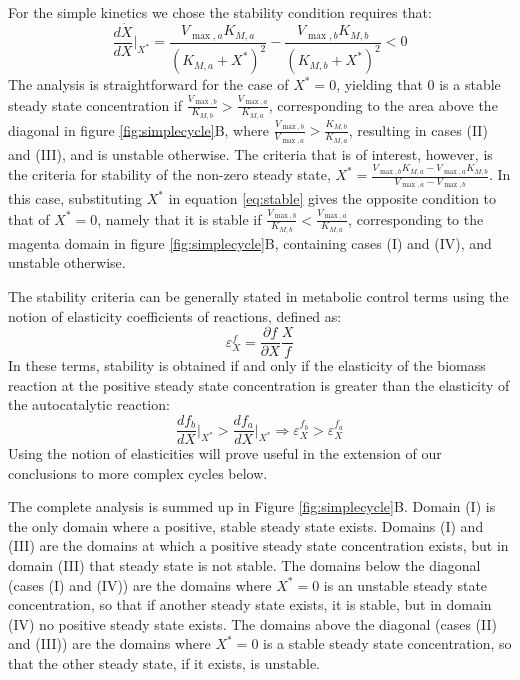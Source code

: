     For the simple kinetics we chose the stability condition requires that:
    \begin{equation}
        \label{eq:stable}
      \frac{d\dot X}{dX}\Big\vert_{X^*} = \frac{V_{\max,a}K_{M,a}}{(K_{M,a}+X^*)^2}-\frac{V_{\max,b}K_{M,b}}{(K_{M,b}+X^*)^2}<0
    \end{equation}
    The analysis is straightforward for the case of $X^*=0$, yielding that $0$ is a stable steady state concentration if $\frac{V_{\max,b}}{K_{M,b}}>\frac{V_{\max,a}}{K_{M,a}}$, corresponding to the area above the diagonal in figure \ref{fig:simplecycle}B, where $\frac{V_{\max,b}}{V_{\max,a}}>\frac{K_{M,b}}{K_{M,a}}$, resulting in cases (II) and (III), and is unstable otherwise.
    The criteria that is of interest, however, is the criteria for stability of the non-zero steady state, $X^*=\frac{V_{\max,b}K_{M,a}-V_{\max,a}K_{M,b}}{V_{\max,a}-V_{\max,b}}$.
    In this case, substituting $X^*$ in equation \ref{eq:stable} gives the opposite condition to that of $X^*=0$, namely that it is stable if $\frac{V_{\max,b}}{K_{M,b}}<\frac{V_{\max,a}}{K_{M,a}}$, corresponding to the magenta domain in figure \ref{fig:simplecycle}B, containing cases (I) and (IV), and unstable otherwise.

    The stability criteria can be generally stated in metabolic control terms \cite{Fell1997-bp} using the notion of elasticity coefficients of reactions, defined as:
    \begin{equation*}
    \varepsilon^f_X=\frac{\partial f}{\partial X}\frac{X}{f}
    \end{equation*}
    In these terms, stability is obtained if and only if the elasticity of the biomass reaction at the positive steady state concentration is greater than the elasticity of the autocatalytic reaction:
    \begin{equation*}
        \frac{df_b}{dX}\Big\vert_{X^*}>\frac{df_a}{dX}\Big\vert_{X^*} \Rightarrow \varepsilon^{f_b}_X>\varepsilon^{f_a}_X
    \end{equation*}
    Using the notion of elasticities will prove useful in the extension of our conclusions to more complex cycles below.
    
    The complete analysis is summed up in Figure \ref{fig:simplecycle}B.
    Domain (I) is the only domain where a positive, stable steady state exists.
    Domains (I) and (III) are the domains at which a positive steady state concentration exists, but in domain (III) that steady state is not stable.
    The domains below the diagonal (cases (I) and (IV)) are the domains where $X^*=0$ is an unstable steady state concentration, so that if another steady state exists, it is stable, but in domain (IV) no positive steady state exists.
    The domains above the diagonal (cases (II) and (III)) are the domains where $X^*=0$ is a stable steady state concentration, so that the other steady state, if it exists, is unstable.

